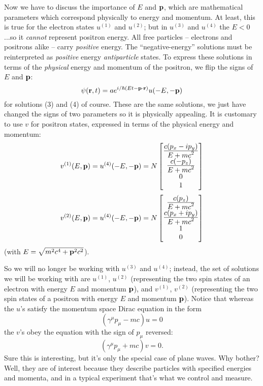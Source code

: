 Now we have to discuss the importance of $E$ and $\bold{p}$, which are mathematical
parameters which correspond physically to energy and momentum. At least, this is
true for the electron states $u^{(1)}$ and $u^{(2)}$; but in $u^{(3)}$ and 
$u^{(4)}$ the $E<0$...so it \emph{cannot} represent positron energy. All free
particles -- electrons and positrons alike -- carry \emph{positive} energy.
The ``negative-energy'' solutions must be reinterpreted as \emph{positive}
energy \emph{antiparticle} states. To express these solutions in terms of 
the \emph{physical} energy and momentum of the positron, we flip the signs of
$E$ and $\bold{p}$:
\begin{equation}
\psi(\bold{r},t) = ae^{i/\hbar(Et - \bold{p}\cdot\bold{r})}u(-E,-\bold{p})
\end{equation}
for solutions (3) and (4) of course. These are the same solutions, we just have
changed the signs of two parameters so it is physically appealing. It is 
customary to use $v$ for positron states, expressed in terms of the physical
energy and momentum:
\begin{equation}
v^{(1)}(E,\bold{p}) = u^{(4)}(-E,-\bold{p}) = N\begin{bmatrix} 
\frac{\displaystyle c(p_x - ip_y)}{\displaystyle E + mc^2}\\
\frac{\displaystyle c(-p_z)}{\displaystyle E + mc^2}\\
0\\
1\end{bmatrix}
\end{equation}
\begin{equation}
v^{(2)}(E,\bold{p}) = u^{(4)}(-E,-\bold{p}) = N\begin{bmatrix} 
\frac{\displaystyle c(p_z)}{\displaystyle E + mc^2}\\
\frac{\displaystyle c(p_x + ip_y)}{\displaystyle E + mc^2}\\
1\\
0\end{bmatrix}
\end{equation}
(with $E=\sqrt{m^2c^4 + \bold{p}^2c^2}$).

So we will no longer be working with $u^{(3)}$ and $u^{(4)}$; instead, the
set of solutions we will be working with are $u^{(1)}$, $u^{(2)}$ (representing
the two spin states of an electron with energy $E$ and momentum $\bold{p}$),
and $v^{(1)}$, $v^{(2)}$ (representing the two spin states of a positron with
energy $E$ and momentum $\bold{p}$). Notice that whereas the $u$'s satisfy the
momentum space Dirac equation in the form
\begin{equation}
(\gamma^\mu p_\mu - mc)u = 0
\end{equation}
the $v$'s obey the equation with the sign of $p_\mu$ reversed:
\begin{equation}
(\gamma^\mu p_\mu + mc)v = 0.
\end{equation}
Sure this is interesting, but it's only the special case of plane waves. Why
bother? Well, they are of interest because they describe particles with 
specified energies and momenta, and in a typical experiment that's what we
control and measure.
